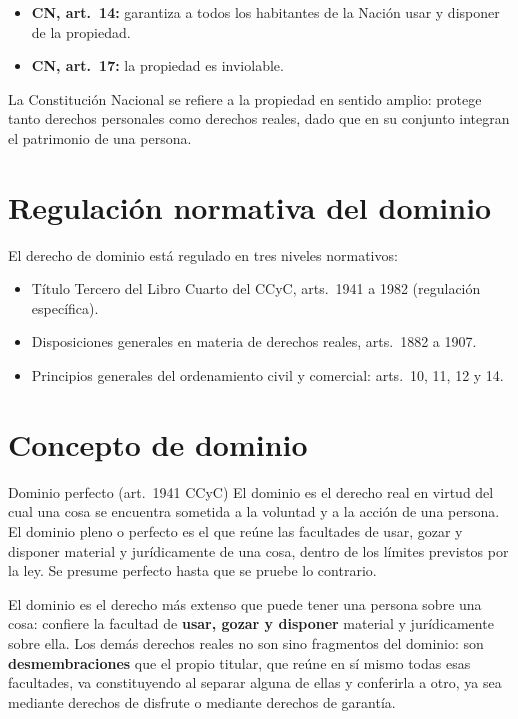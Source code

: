 \documentclass[12pt,oneside]{book}
\begin{document}
\begin{itemize}
    \item \textbf{CN, art.~14:} garantiza a todos los habitantes de la Nación usar y disponer de la propiedad.
    \item \textbf{CN, art.~17:} la propiedad es inviolable.
\end{itemize}

La Constitución Nacional se refiere a la propiedad en sentido amplio: protege tanto derechos personales como derechos reales, dado que en su conjunto integran el patrimonio de una persona.

\section{Regulación normativa del dominio}

El derecho de dominio está regulado en tres niveles normativos:

\begin{itemize}
    \item Título Tercero del Libro Cuarto del CCyC, arts.~1941 a 1982 (regulación específica).
    \item Disposiciones generales en materia de derechos reales, arts.~1882 a 1907.
    \item Principios generales del ordenamiento civil y comercial: arts.~10, 11, 12 y 14.
\end{itemize}

\section{Concepto de dominio}

\begin{definition}{Dominio perfecto (art.~1941 CCyC)}
El dominio es el derecho real en virtud del cual una cosa se encuentra sometida a la voluntad y a la acción de una persona. El dominio pleno o perfecto es el que reúne las facultades de usar, gozar y disponer material y jurídicamente de una cosa, dentro de los límites previstos por la ley. Se presume perfecto hasta que se pruebe lo contrario.
\end{definition}

El dominio es el derecho más extenso que puede tener una persona sobre una cosa: confiere la facultad de \textbf{usar, gozar y disponer} material y jurídicamente sobre ella. Los demás derechos reales no son sino fragmentos del dominio: son \textbf{desmembraciones} que el propio titular, que reúne en sí mismo todas esas facultades, va constituyendo al separar alguna de ellas y conferirla a otro, ya sea mediante derechos de disfrute o mediante derechos de garantía.
\end{document}
